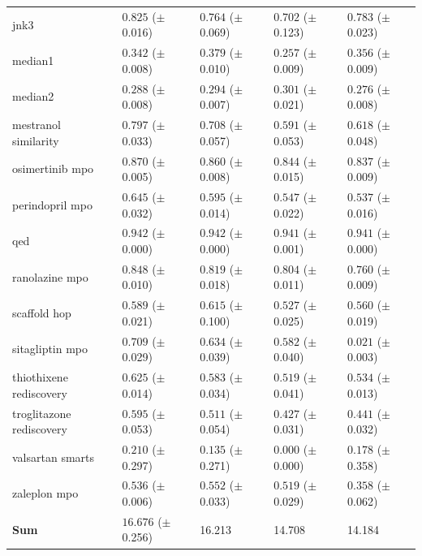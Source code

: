 \documentclass{article} %
\begin{document}
\begin{table}[ht]
\begin{tabularx}{\linewidth}{l|>{}p{2.2cm} Y Y Y }
\small{jnk3} & $\mathbf{0.825}$ {\tiny ($\pm$ 0.016)} & $0.764$ {\tiny ($\pm$ 0.069)} & $0.702$ {\tiny ($\pm$ 0.123)} & $0.783$ {\tiny ($\pm$ 0.023)} \\
\small{median1} & $0.342$ {\tiny ($\pm$ 0.008)} & $\mathbf{0.379}$ {\tiny ($\pm$ 0.010)} & $0.257$ {\tiny ($\pm$ 0.009)} & $0.356$ {\tiny ($\pm$ 0.009)} \\
\small{median2} & $\mathbf{0.288}$ {\tiny ($\pm$ 0.008)} & $\mathbf{0.294}$ {\tiny ($\pm$ 0.007)} & $\mathbf{0.301}$ {\tiny ($\pm$ 0.021)} & $0.276$ {\tiny ($\pm$ 0.008)} \\
\small{mestranol similarity} & $\mathbf{0.797}$ {\tiny ($\pm$ 0.033)} & $0.708$ {\tiny ($\pm$ 0.057)} & $0.591$ {\tiny ($\pm$ 0.053)} & $0.618$ {\tiny ($\pm$ 0.048)} \\
\small{osimertinib mpo} & $\mathbf{0.870}$ {\tiny ($\pm$ 0.005)} & $0.860$ {\tiny ($\pm$ 0.008)} & $0.844$ {\tiny ($\pm$ 0.015)} & $0.837$ {\tiny ($\pm$ 0.009)} \\
\small{perindopril mpo} & $\mathbf{0.645}$ {\tiny ($\pm$ 0.032)} & $0.595$ {\tiny ($\pm$ 0.014)} & $0.547$ {\tiny ($\pm$ 0.022)} & $0.537$ {\tiny ($\pm$ 0.016)} \\
\small{qed} & $\mathbf{0.942}$ {\tiny ($\pm$ 0.000)} & $\mathbf{0.942}$ {\tiny ($\pm$ 0.000)} & $0.941$ {\tiny ($\pm$ 0.001)} & $0.941$ {\tiny ($\pm$ 0.000)} \\
\small{ranolazine mpo} & $\mathbf{0.848}$ {\tiny ($\pm$ 0.010)} & $0.819$ {\tiny ($\pm$ 0.018)} & $0.804$ {\tiny ($\pm$ 0.011)} & $0.760$ {\tiny ($\pm$ 0.009)} \\
\small{scaffold hop} & $\mathbf{0.589}$ {\tiny ($\pm$ 0.021)} & $\mathbf{0.615}$ {\tiny ($\pm$ 0.100)} & $\mathbf{0.527}$ {\tiny ($\pm$ 0.025)} & $\mathbf{0.560}$ {\tiny ($\pm$ 0.019)} \\
\small{sitagliptin mpo} & $\mathbf{0.709}$ {\tiny ($\pm$ 0.029)} & $0.634$ {\tiny ($\pm$ 0.039)} & $0.582$ {\tiny ($\pm$ 0.040)} & $0.021$ {\tiny ($\pm$ 0.003)} \\
\small{thiothixene rediscovery} & $\mathbf{0.625}$ {\tiny ($\pm$ 0.014)} & $0.583$ {\tiny ($\pm$ 0.034)} & $0.519$ {\tiny ($\pm$ 0.041)} & $0.534$ {\tiny ($\pm$ 0.013)} \\
\small{troglitazone rediscovery} & $\mathbf{0.595}$ {\tiny ($\pm$ 0.053)} & $0.511$ {\tiny ($\pm$ 0.054)} & $0.427$ {\tiny ($\pm$ 0.031)} & $0.441$ {\tiny ($\pm$ 0.032)} \\
\small{valsartan smarts} & $\mathbf{0.210}$ {\tiny ($\pm$ 0.297)} & $\mathbf{0.135}$ {\tiny ($\pm$ 0.271)} & $\mathbf{0.000}$ {\tiny ($\pm$ 0.000)} & $\mathbf{0.178}$ {\tiny ($\pm$ 0.358)} \\
\small{zaleplon mpo} & $\mathbf{0.536}$ {\tiny ($\pm$ 0.006)} & $\mathbf{0.552}$ {\tiny ($\pm$ 0.033)} & $\mathbf{0.519}$ {\tiny ($\pm$ 0.029)} & $0.358$ {\tiny ($\pm$ 0.062)} \\
\midrule
\textbf{Sum} & $\mathbf{16.676}$ {\tiny ($\pm$ 0.256)} & 16.213 & 14.708 & 14.184 \\
\bottomrule
\end{tabularx}
\end{table}
\end{document}
